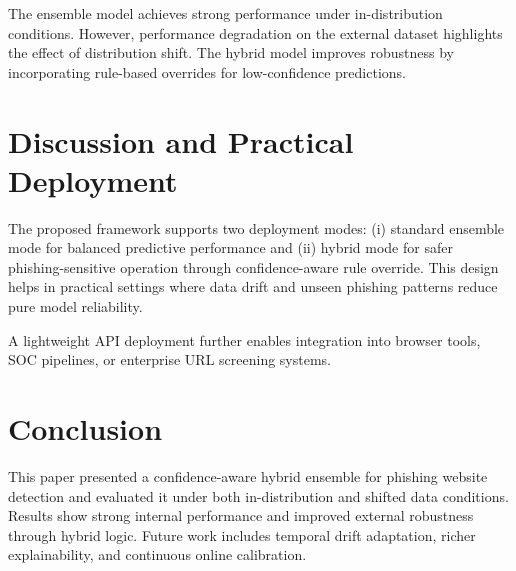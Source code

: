 ﻿\documentclass[conference]{IEEEtran}
\begin{document}
The ensemble model achieves strong performance under in-distribution conditions. However, performance degradation on the external dataset highlights the effect of distribution shift. The hybrid model improves robustness by incorporating rule-based overrides for low-confidence predictions.

\section{Discussion and Practical Deployment}
The proposed framework supports two deployment modes: (i) standard ensemble mode for balanced predictive performance and (ii) hybrid mode for safer phishing-sensitive operation through confidence-aware rule override. This design helps in practical settings where data drift and unseen phishing patterns reduce pure model reliability.

A lightweight API deployment further enables integration into browser tools, SOC pipelines, or enterprise URL screening systems.

\section{Conclusion}
This paper presented a confidence-aware hybrid ensemble for phishing website detection and evaluated it under both in-distribution and shifted data conditions. Results show strong internal performance and improved external robustness through hybrid logic. Future work includes temporal drift adaptation, richer explainability, and continuous online calibration.



\end{document}
